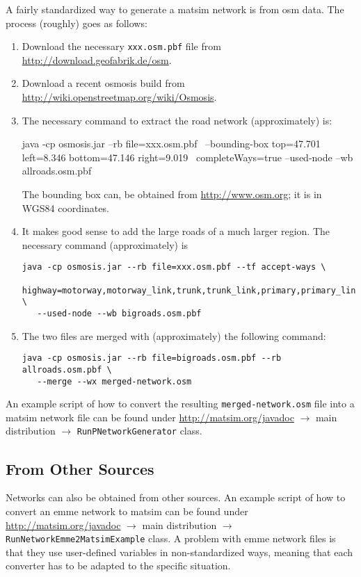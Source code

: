 A fairly standardized way to generate a \gls{matsim} network is from \gls{osm} data.  The process (roughly) goes as follows:
\begin{enumerate}

\item Download the necessary \lstinline{xxx.osm.pbf} file from \url{http://download.geofabrik.de/osm}.

\item Download a recent \gls{osmosis} build from \url{http://wiki.openstreetmap.org/wiki/Osmosis}.

\item The necessary command to extract the road network (approximately) is:
\begin{shell}
java -cp osmosis.jar --rb file=xxx.osm.pbf \
   --bounding-box top=47.701 left=8.346 bottom=47.146 right=9.019 \
   completeWays=true --used-node --wb allroads.osm.pbf
\end{shell}
The bounding box can, \eg be obtained from \url{http://www.osm.org}; it is in WGS84 coordinates.

\item It makes good sense to add the large roads of a much larger region.  The necessary command (approximately) is
\begin{lstlisting}
java -cp osmosis.jar --rb file=xxx.osm.pbf --tf accept-ways \
   highway=motorway,motorway_link,trunk,trunk_link,primary,primary_link \ 
   --used-node --wb bigroads.osm.pbf
\end{lstlisting}

\item The two files are merged with (approximately) the following command:
\begin{lstlisting}
java -cp osmosis.jar --rb file=bigroads.osm.pbf --rb allroads.osm.pbf \
   --merge --wx merged-network.osm
\end{lstlisting}

\end{enumerate}
An example script of how to convert the resulting \lstinline{merged-network.osm} file into a \gls{matsim} network file can be found under \url{http://matsim.org/javadoc} $\to$ main distribution $\to$ \lstinline{RunPNetworkGenerator} class.

\subsection{From Other Sources}

Networks can also be obtained from other sources.  An example script of how to convert an \gls{emme} network to \gls{matsim} can be found under \url{http://matsim.org/javadoc} $\to$ main distribution $\to$ \lstinline{RunNetworkEmme2MatsimExample} class.  A problem with \gls{emme} network files is that they use user-defined variables in non-standardized ways, meaning that each converter has to be adapted to the specific situation.

